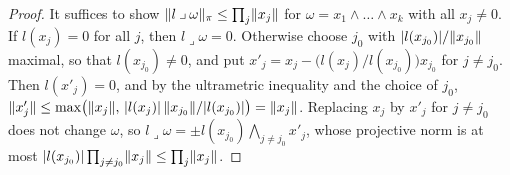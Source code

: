 \begin{proof}
It suffices to show $\lVert l\mathbin{\lrcorner}\omega\rVert_\pi\le\prod_j\lVert x_j\rVert$ for $\omega=x_1\wedge\dots\wedge x_k$ with all $x_j\ne0$.
If $l(x_j)=0$ for all $j$, then $l\mathbin{\lrcorner}\omega=0$. Otherwise choose $j_0$ with $\lvert l(x_{j_0})\rvert/\lVert x_{j_0}\rVert$ maximal, so
that $l(x_{j_0})\ne0$, and put $x'_j=x_j-\bigl(l(x_j)/l(x_{j_0})\bigr)x_{j_0}$ for $j\ne j_0$. Then $l(x'_j)=0$, and by the
ultrametric inequality and the choice of $j_0$,
$\lVert x'_j\rVert\le\max\bigl(\lVert x_j\rVert,\,\lvert l(x_j)\rvert\,\lVert x_{j_0}\rVert/\lvert l(x_{j_0})\rvert\bigr)=\lVert x_j\rVert$. Replacing $x_j$ by $x'_j$ for $j\ne j_0$
does not change $\omega$, so $l\mathbin{\lrcorner}\omega=\pm l(x_{j_0})\bigwedge_{j\ne j_0}x'_j$, whose projective norm is at most
$\lvert l(x_{j_0})\rvert\prod_{j\ne j_0}\lVert x_j\rVert\le\prod_j\lVert x_j\rVert$.
\end{proof}


